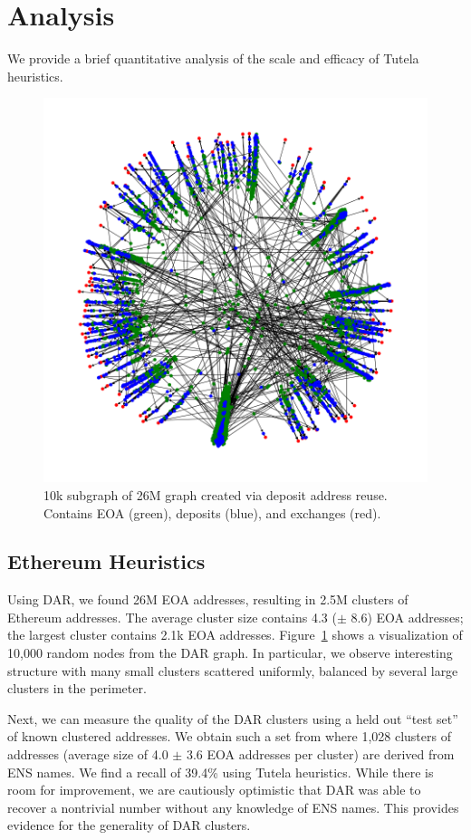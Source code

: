\section{Analysis} \label{sec:analysis}

We provide a brief quantitative analysis of the scale and efficacy of Tutela heuristics.
\begin{figure}[h!]
\includegraphics[width=\linewidth]{figures/dar_graph.png}
\caption{10k subgraph of 26M graph created via deposit address reuse. Contains EOA (green), deposits (blue), and exchanges (red).}
\label{fig:dargraph}
\end{figure}
\subsection{Ethereum Heuristics}

Using DAR, we found 26M EOA addresses, resulting in 2.5M clusters of Ethereum addresses. The average cluster size contains 4.3 ($\pm$ 8.6) EOA addresses; the largest cluster contains 2.1k EOA addresses. Figure~\ref{fig:dargraph} shows a visualization of 10,000 random nodes from the DAR graph. In particular, we observe interesting structure with many small clusters scattered uniformly, balanced by several large clusters in the perimeter.

Next, we can measure the quality of the DAR clusters using a held out ``test set'' of known clustered addresses. We obtain such a set from \cite{beres2021blockchain} where 1,028 clusters of addresses (average size of 4.0 $\pm$ 3.6 EOA addresses per cluster) are derived from ENS names. We find a recall of 39.4\% using Tutela heuristics. While there is room for improvement, we are cautiously optimistic that DAR was able to recover a nontrivial number without any knowledge of ENS names. This provides evidence for the generality of DAR clusters.

